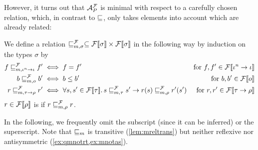 \documentclass[a4paper,twoside,notitlepage,openright,11pt]{report}
\begin{document}
However, it turns out that $\mathcal A^\mathcal F_P$ is minimal with respect to a carefully chosen relation, which, in contrast to $\sqsubseteq$, only takes elements into account which are already related:
\begin{definition}
  We define a relation $\sqsubseteq^\mathcal F_{m,\sigma}\subseteq{\mathcal F}\llbracket\sigma\rrbracket\times{\mathcal F}\llbracket\sigma\rrbracket$ in the following way by induction on the types $\sigma$ by
\begin{align*}
  f\sqsubseteq^\mathcal F_{m,{\iota^n\to\iota}} f'&\iff f=f'&\text{for }f,f'\in{\mathcal F}\llbracket\iota^n\to\iota\rrbracket\\
  b\sqsubseteq^\mathcal F_{m,o} b'&\iff b\leq b'&\text{for }b,b'\in{\mathcal F}\llbracket o\rrbracket\\
  r\sqsubseteq^\mathcal F_{m,\tau\to\rho} r'&\iff\forall s, s'\in{\mathcal F}\llbracket\tau\rrbracket\ldotp s\sqsubseteq^\mathcal F_{m,\tau} s'\rightarrow r(s)\sqsubseteq^\mathcal F_{m,\rho} r'(s')&\text{for }r,r'\in{\mathcal F}\llbracket\tau\to\rho\rrbracket
\end{align*}
$r\in{\mathcal F}\llbracket\rho\rrbracket$ is  if $r\sqsubseteq^\mathcal F_{m,\rho} r$.
\end{definition}
In the following, we frequently omit the subscript (since it can be inferred) or the superscript. Note that $\sqsubseteq_m$ is transitive (\cref{lem:mreltrans}) but neither reflexive nor antisymmetric (\cref{ex:qmnotrt,ex:mnotas}).
\end{document}
